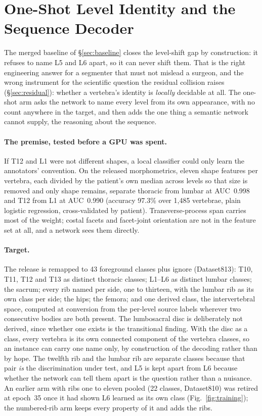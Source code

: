 \documentclass{article}
\begin{document}
\section{One-Shot Level Identity and the Sequence Decoder}
\label{sec:oneshot}

The merged baseline of \S\ref{sec:baseline} closes the
level-shift gap by construction: it refuses to name L5
and L6 apart, so it can never shift them. That is the
right engineering answer for a segmenter that must not
mislead a surgeon, and the wrong instrument for the
scientific question the residual collision raises
(\S\ref{sec:residual}): whether a vertebra's identity is
\emph{locally} decidable at all. The one-shot arm asks the
network to name every level from its own appearance, with
no count anywhere in the target, and then adds the one
thing a semantic network cannot supply, the reasoning
about the sequence.

\paragraph{The premise, tested before a GPU was spent.}
If T12 and L1 were not different shapes, a local
classifier could only learn the annotators' convention.
On the released morphometrics, eleven shape features per
vertebra, each divided by the patient's own median across
levels so that size is removed and only shape remains,
separate thoracic from lumbar at AUC~0.998 and T12 from
L1 at AUC~0.990 (accuracy 97.3\% over 1{,}485 vertebrae,
plain logistic regression, cross-validated by patient).
Transverse-process span carries most of the weight;
costal facets and facet-joint orientation are not in the
feature set at all, and a network sees them directly.

\paragraph{Target.} The release is remapped to 43
foreground classes plus ignore (Dataset813): T10, T11,
T12 and T13 as distinct thoracic classes; L1--L6 as
distinct lumbar classes; the sacrum; every rib named per
side, one to thirteen, with the lumbar rib as its own
class per side; the hips; the femora; and one derived
class, the intervertebral space, computed at conversion
from the per-level source labels wherever two consecutive
bodies are both present. The lumbosacral disc is
deliberately not derived, since whether one exists is the
transitional finding. With the disc as a class, every
vertebra is its own connected component of the vertebra
classes, so an instance can carry one name only, by
construction of the decoding rather than by hope. The
twelfth rib and the lumbar rib are separate classes
because that pair \emph{is} the discrimination under
test, and L5 is kept apart from L6 because whether the
network can tell them apart is the question rather than
a nuisance. An earlier arm with ribs one to eleven pooled
(22 classes, Dataset810) was retired at epoch~35 once it
had shown L6 learned as its own class
(Fig.~\ref{fig:training}); the numbered-rib arm keeps
every property of it and adds the ribs.
\end{document}
